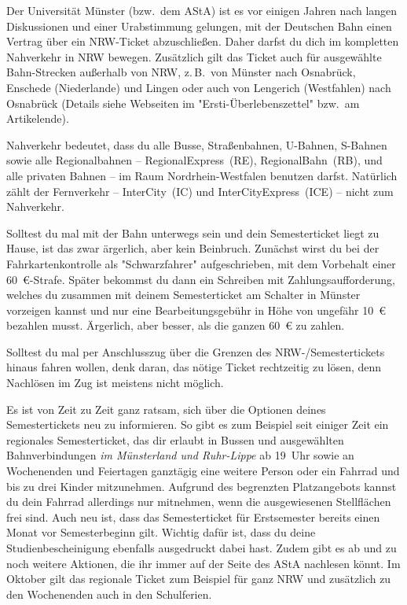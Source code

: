 \begin{multicols*}{2}
Der Universität Münster (bzw.\ dem AStA) ist es vor einigen Jahren nach langen Diskussionen und einer Urabstimmung gelungen, mit der Deutschen Bahn einen Vertrag über ein NRW-Ticket abzuschließen.
Daher darfst du dich im kompletten Nahverkehr in NRW bewegen.
Zusätzlich gilt das Ticket auch für ausgewählte Bahn-Strecken außerhalb von NRW, z.\,B.\ von Münster nach Osnabrück, Enschede (Niederlande) und Lingen oder auch von Lengerich (Westfahlen) nach Osnabrück (Details siehe Webseiten im "Ersti-Überlebenszettel" bzw.\ am Artikelende).

Nahverkehr bedeutet, dass du alle Busse, Straßenbahnen, U-Bahnen, S-Bahnen sowie alle Regionalbahnen -- RegionalExpress~(RE), RegionalBahn~(RB), und alle privaten Bahnen -- im Raum Nordrhein-Westfalen benutzen darfst.
Natürlich zählt der Fernverkehr -- InterCity~(IC) und InterCityExpress~(ICE) -- nicht zum Nahverkehr.

Solltest du mal mit der Bahn unterwegs sein und dein Semesterticket liegt zu Hause, ist das zwar ärgerlich, aber kein Beinbruch.
Zunächst wirst du bei der Fahrkartenkontrolle als "Schwarzfahrer" aufgeschrieben, mit dem Vorbehalt einer \SI{60}{\euro}-Strafe.
Später bekommst du dann ein Schreiben mit Zahlungsaufforderung, welches du zusammen mit deinem Semesterticket am Schalter in Münster vorzeigen kannst und nur eine Bearbeitungsgebühr in Höhe von ungefähr \SI{10}{\euro} bezahlen musst.
Ärgerlich, aber besser, als die ganzen \SI{60}{\euro} zu zahlen.

Solltest du mal per Anschlusszug über die Grenzen des NRW-/Semestertickets hinaus fahren wollen, denk daran, das nötige Ticket rechtzeitig zu lösen, denn Nachlösen im Zug ist meistens nicht möglich.

Es ist von Zeit zu Zeit ganz ratsam, sich über die Optionen deines Semestertickets neu zu informieren.
So gibt es zum Beispiel seit einiger Zeit ein regionales Semesterticket, das dir erlaubt in Bussen und ausgewählten Bahnverbindungen \emph{im Münsterland und Ruhr-Lippe} ab 19~Uhr sowie an Wochenenden und Feiertagen ganztägig eine weitere Person oder ein Fahrrad und bis zu drei Kinder mitzunehmen. Aufgrund des begrenzten Platzangebots kannst du dein Fahrrad allerdings nur mitnehmen, wenn die ausgewiesenen Stellflächen frei sind.
Auch neu ist, dass das Semesterticket für Erstsemester bereits einen Monat vor Semesterbeginn gilt. Wichtig dafür ist, dass du deine Studienbescheinigung ebenfalls ausgedruckt dabei hast. Zudem gibt es ab und zu noch weitere Aktionen, die ihr immer auf der Seite des AStA nachlesen könnt. Im Oktober gilt das regionale Ticket zum Beispiel für ganz NRW und zusätzlich zu den Wochenenden auch in den Schulferien.


\end{multicols*}

